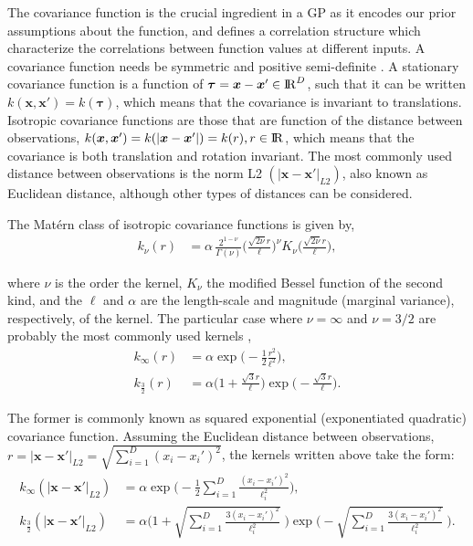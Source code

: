 \documentclass[onecolumn,a4paper,11pt]{article}
\begin{document}
The covariance function is the crucial ingredient in a GP as it encodes our prior assumptions about the function, and defines a correlation structure which characterize the correlations between function values at different inputs. A covariance function needs be symmetric and positive semi-definite \citep{rasmussen2006gaussian}. A stationary covariance function is a function of $\bm{\tau}=\bm{x}-\bm{x}' \in {\rm I\!R}^D$, such that it can be written $k(\bm{x},\bm{x}') = k(\bm{\tau})$, which means that the covariance is invariant to translations. Isotropic covariance functions are those that are function of the distance between observations, $k(\bm{x},\bm{x}') = k(|\bm{x}-\bm{x}'|) = k(r), r\in {\rm I\!R}$, which means that the covariance is both translation and rotation invariant. The most commonly used distance between observations is the norm L2 $(|\bm{x}-\bm{x}'|_{L2})$, also known as Euclidean distance, although other types of distances can be considered. 

The Mat\'ern class of isotropic covariance functions is given by, 
%
\begin{align*}
k_{\nu}(r)&=\alpha \, \frac{2^{1-\nu}}{\Gamma(\nu)}\Big(\frac{\sqrt{2\nu}r}{\ell}\Big)^{\!\nu} \! K_{\nu} \Big(\frac{\sqrt{2\nu}r}{\ell}\Big),
\end{align*}

\noindent where $\nu$ is the order the kernel, $K_{\nu}$ the modified Bessel function of the second kind, and the $\ell$ and $\alpha$ are the length-scale and magnitude (marginal variance), respectively, of the kernel. The particular case where $\nu=\infty$ and $\nu=3/2$ are probably the most commonly used kernels \citep{rasmussen2006gaussian}, 
%
\begin{align*}
k_{\infty}(r)&=\alpha \exp\!\! \big(\! -\frac{1}{2} \frac{r^2}{\ell^2}\big),  \\
k_{\frac{3}{2}}(r)&=\alpha\Big(1+\frac{\sqrt{3}r}{\ell}\Big) \! \exp\!\! \big(\! -\frac{\sqrt{3}r}{\ell}\big). 
\end{align*}

\noindent The former is commonly known as squared exponential (exponentiated quadratic) covariance function. Assuming the Euclidean distance between observations, $r=|\bm{x}-\bm{x}'|_{L2}=\sqrt{\sum_{i=1}^{D}(x_i-x_i')^2}$, the kernels written above take the form:
%
\begin{align*}
k_{\infty}(|\bm{x}-\bm{x}'|_{L2})&=\alpha \exp\!\!\Big(\! -\frac{1}{2} \sum_{i=1}^{D}\frac{(x_i-x_i')^2}{\ell_i^2}\Big),\\
k_{\frac{3}{2}}(|\bm{x}-\bm{x}'|_{L2})&=\alpha \bigg(1+\sqrt{\sum_{i=1}^{D}\frac{3(x_i-x_i')^2}{\ell_i^2}}\;\bigg) \! \exp\!\!\Big(\! - \sqrt{\sum_{i=1}^{D}\frac{3(x_i-x_i')^2}{\ell_i^2}}\;\Big). \\
\end{align*}
\end{document}
